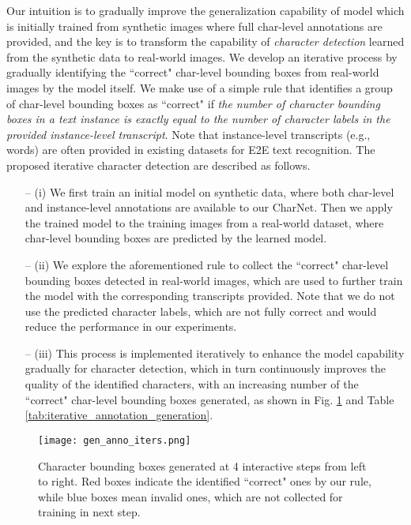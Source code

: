 \documentclass[10pt,twocolumn,letterpaper]{article}
\begin{document}
 Our intuition is to gradually improve the generalization capability of model which is initially trained from synthetic images where full char-level annotations are provided, and the key is to transform the capability of \emph{character detection} learned from the synthetic data to real-world images.  We develop an iterative process by gradually identifying the ``correct" char-level bounding boxes from real-world images by the model itself. We make use of a simple rule that identifies a group of char-level bounding boxes as ``correct" if \emph{the number of character bounding boxes in a text instance is exactly equal to the number of character labels in the provided instance-level transcript}. Note that instance-level transcripts (e.g., words) are often provided in existing datasets for E2E text recognition.
The proposed iterative character detection are described as follows.
\begin{itemize}
\item[--] (i) We first train an initial model on synthetic data, where both char-level and instance-level annotations are available to our CharNet. Then we apply the trained model to the training images from a real-world dataset, where char-level bounding boxes are predicted by the learned model.
\item[--] (ii) We explore the aforementioned rule to collect the ``correct" char-level bounding boxes detected in real-world images, which are used to further train the model with the corresponding transcripts provided. Note that we do not use the predicted character labels, which are not fully correct and would reduce the performance in our experiments.



\item[--] (iii) This process is implemented iteratively to enhance the model capability gradually for character detection, which in turn continuously improves the quality of the identified characters, with an increasing number of the ``correct" char-level bounding boxes generated, as shown in Fig. \ref{fig:iteration} and Table \ref{tab:iterative_annotation_generation}.
\end{itemize}





\begin{figure}[!t]
    \begin{center}
        \texttt{[image: gen\_anno\_iters.png]}
    \end{center}
    \vspace{-4mm}
    \caption{Character bounding boxes generated at 4 interactive steps from left to right.  Red boxes indicate the identified ``correct" ones by our rule, while blue boxes mean invalid ones, which are not collected for training in next step.}
    \label{fig:iteration}
\end{figure}
\end{document}
